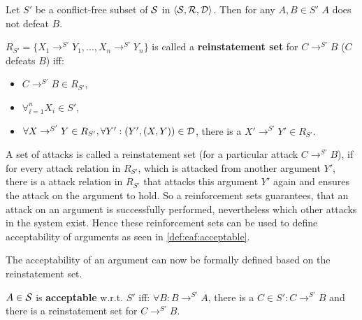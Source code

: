 \begin{lemma}
Let $S'$ be a conflict-free subset of $\S$ in $\langle \S, \R, \D \rangle$. Then for any $A, B \in S'$ $A$ does not defeat $B$.
\end{lemma}

\begin{definition}

$R_{S'} = \{X_1 \rightarrow^{S'} Y_1, ..., 	X_n \rightarrow^{S'} Y_n\}$ is called a \textbf{reinstatement set} for $C \rightarrow^{S'} B$ ($C$ defeats $B$) iff:
\begin{itemize}
	\item $C \rightarrow^{S'} B \in R_{S'}$,
	\item $\forall_{i=1}^n X_i \in S'$,
	\item $\forall X \rightarrow^{S'} Y \in R_{S'}, \forall Y': (Y', (X, Y)) \in \D$, there is a $X' \rightarrow^{S'} Y' \in R_{S'}$.
\end{itemize}
\end{definition}

\begin{remark}
A set of attacks is called a reinstatement set (for a particular attack $C \rightarrow^{S'} B$), if for every attack relation in $R_{S'}$, which is attacked from another argument $Y'$, there is a attack relation in $R_{S'}$ that attacks this argument $Y'$ again and ensures the attack on the argument to hold. So a reinforcement sets guarantees, that an attack on an argument is successfully performed, nevertheless which other attacks in the system exist. Hence these reinforcement sets can be used to define acceptability of arguments as seen in \cref{def:eaf:acceptable}.
\end{remark}


The acceptability of an argument can now be formally defined based on the reinstatement set.

\begin{definition}
\label{def:eaf:acceptable}
$A \in \S$ is \textbf{acceptable} w.r.t.	 $S'$ iff: $\forall B: B \rightarrow^{S'} A$, there is a $C \in S': C \rightarrow^{S'} B$ and there is a reinstatement set for $C \rightarrow^{S'} B$.
\end{definition}


